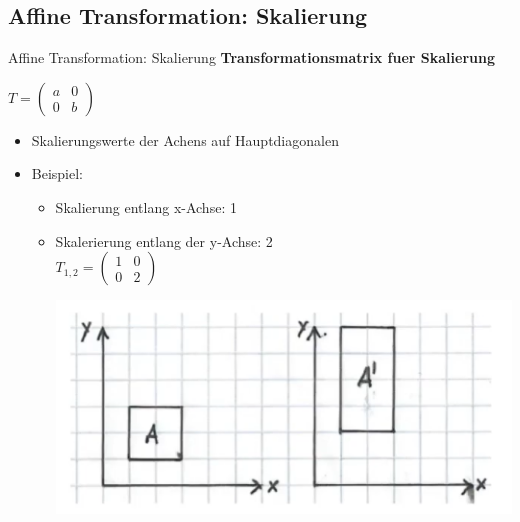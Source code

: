 \documentclass[10pt,aspectratio=169]{beamer}
\begin{document}
  \subsection{Affine Transformation: Skalierung}
  \begin{frame}{Affine Transformation: Skalierung}
    \textbf{Transformationsmatrix fuer Skalierung}
    \begin{center}
      $T = \begin{pmatrix}
        a & 0\\
        0 & b
      \end{pmatrix}$
      \begin{itemize}
        \item Skalierungswerte der Achens auf Hauptdiagonalen
        \item Beispiel:
        \begin{itemize}
          \item Skalierung entlang x-Achse: 1
          \item Skalerierung entlang der y-Achse: 2
            \\\vspace{0.1cm}
            $T_{1,2} = \begin{pmatrix}
              1 & 0\\
              0 & 2
            \end{pmatrix}
            $
          \begin{center}
            \includegraphics[scale=0.15]{skalierung}  
          \end{center}
          
          
        \end{itemize}
      \end{itemize}
    \end{center}
  \end{frame}
\end{document}

